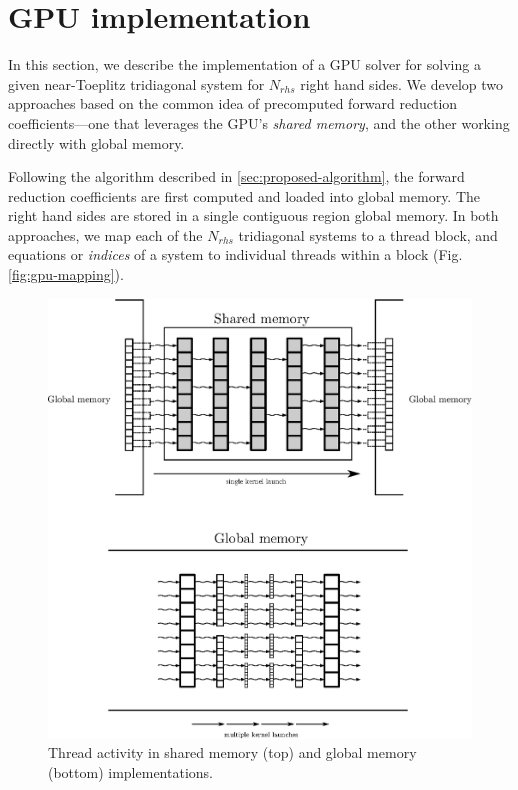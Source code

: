 \documentclass{elsarticle}
\begin{document}
\section{GPU implementation} \label{sec:gpu-implementation}

In this section, we describe the implementation of a GPU solver
for solving a given near-Toeplitz tridiagonal system
for $N_{rhs}$ right hand sides.
We develop two approaches based on the common idea
of precomputed forward reduction coefficients---one that leverages
the GPU's \emph{shared memory},
and the other working directly with global memory.

Following the algorithm described in \ref{sec:proposed-algorithm},
the forward reduction coefficients
are first computed and loaded into global memory.
The right hand sides are stored in a single
contiguous region global memory.
In both approaches,
we map each of the $N_{rhs}$ tridiagonal systems
to a thread block,
and equations or \emph{indices} of a system
to individual threads within a block
(Fig. \ref{fig:gpu-mapping}).

\begin{figure}[h!]
\begin{center}
\includegraphics[width=400pt]{img/global-and-shared.eps}
\end{center}
\caption{Thread activity in shared memory (top) and global memory (bottom) implementations.}
\label{fig:global-and-shared}
\end{figure}
\end{document}
